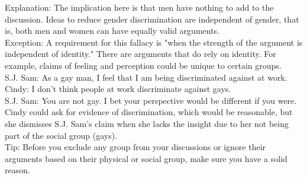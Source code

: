 \documentclass[a4paper,12pt,single,pdftex]{scrbook}
\begin{document}
    
      Explanation: The implication here is that men have nothing to add to the discussion. Ideas to reduce gender discrimination are independent of gender, that is, both men and women can have equally valid arguments.
    \\

    
      Exception: A requirement for this fallacy is "when the strength of the argument is independent of identity." There are arguments that do rely on identity. For example, claims of feeling and perception could be unique to certain groups.
    \\

    
      S.J. Sam: As a gay man, I feel that I am being discriminated against at work.
    \\

    
      Cindy: I don't think people at work discriminate against gays.
    \\

    
      S.J. Sam: You are not gay. I bet your perspective would be different if you were.
    \\

    
      Cindy could ask for evidence of discrimination, which would be reasonable, but she dismisses S.J. Sam's claim when she lacks the insight due to her not being part of the social group (gays).
    \\

    
      Tip: Before you exclude any group from your discussions or ignore their arguments based on their physical or social group, make sure you have a solid reason.
    \\

  
\end{document}
